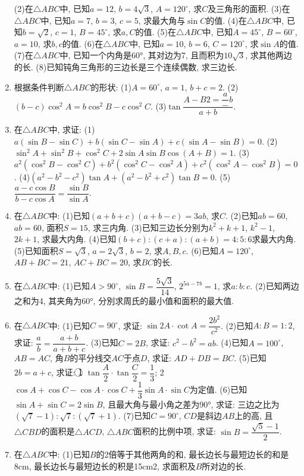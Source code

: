 \documentclass[10pt,a4paper]{article}
\begin{document}
\begin{enumerate}[1.]
(2)在$\triangle ABC$中, 已知$a=12$, $b=4\sqrt 3$, $A=120^\circ$, 求$C$及三角形的面积.
(3)在$\triangle ABC$中, 已知$a=7$, $b=3$, $c=5$, 求最大角与$\sin C$的值.
(4)在$\triangle ABC$中, 已知$b=\sqrt 2$, $c=1$, $B=45^\circ$, 求$a,C$的值.
(5)在$\triangle ABC$中, 已知$A=45^\circ$, $B=60^\circ$, $a=10$, 求$b,c$的值.
(6)在$\triangle ABC$中, 已知$a=10$, $b=6$, $C=120^\circ$, 求$\sin A$的值.
(7)在$\triangle ABC$中, 已知一个内角是60°, 其对边为7, 且而积为$10\sqrt 3$, 求其他两边的长.
(8)已知钝角三角形的三边长是三个连续偶数, 求三边长.
\item 根据条件判断$\triangle ABC$的形状:
(1)$A=60^{\circ}$, $a=1$, $b+c=2$.			(2)$(b-c)\cos ^2A=b\cos ^2B-c\cos ^2C$.
(3)$\tan \dfrac{A-B2=\dfrac a-b}{a+b}$.
\item 在$\triangle ABC$中, 求证:
(1)$a(\sin B-\sin C)+b(\sin C-\sin A)+c(\sin A-\sin B)=0$.
(2)$\sin ^2A+\sin ^2B+\cos ^2C+2\sin A\sin B\cos (A+B)=1$.
(3)$a^2(\cos ^2B-\cos ^2C)+b^2(\cos ^2C-\cos ^2A)+c^2(\cos ^2A-\cos ^2B)=0$.
(4)$(a^2-b^2-c^2)\tan A+(a^2-b^2+c^2)\tan B=0$.
(5)$\dfrac{a-c\cos B}{b-c\cos A}=\dfrac{\sin B}{\sin A}$.
\item 在$\triangle ABC$中:
(1)已知$(a+b+c)(a+b-c)=3ab$, 求$C$.
(2)已知$ab=60$, $ab=60$, 面积$S=15$, 求三内角.
(3)已知三边长分别为$k^2+k+1$, $k^2-1$, $2k+1$, 求最大内角.
(4)已知$(b+c):(c+a):(a+b)=4:5:6$求最大内角.
(5)已知面积$S=\sqrt 3$, $a=2\sqrt 3$, $b=2$, 求$A,B,c$.
(6)已知$A=120^\circ$, $AB+BC=21$, $AC+BC=20$, 求$BC$的长.
\item 在$\triangle ABC$中:
(1)已知$A>90^{\circ}$, $\sin B=\dfrac{5\sqrt 3}{14}$, $2^{5a-7b}=1$, 求$a:b:c$.
(2)已知两边之和为4, 其夹角为60°, 分別求周氏的最小值和面积的最大值.
\item 在$\triangle ABC$中:
(1)已知$C=90^{\circ}$, 求证: $\sin 2A\cdot \cot A=\dfrac{2b^2}{c^2}$.
(2)已知$A:B=1:2$, 求证: $\dfrac ab=\dfrac{a+b}{a+b+c}$.
(3)已知$C=2B$, 求证: $c^2-b^2=ab$.
(4)已知$A=100^\circ$, $AB=AC$, 角$B$的平分线交$AC$于点$D$, 求证: $AD+DB=BC$.
(5)已知$2b=a+c$, 求证:
\textcircled{1} $\tan \dfrac A2\cdot \tan \dfrac C2=\dfrac 13$;
\textcircled{2} $\cos A+\cos C-\cos A\cdot \cos C+\dfrac 13\sin A\cdot \sin C$为定值.
(6)已知$\sin A+\sin C=2\sin B$, 且最大角与最小角之差为90°, 求证: 三边之比为$(\sqrt 7-1):\sqrt 7:(\sqrt 7+1)$.
(7)已知$C=90^\circ$, $CD$是斜边$AB$上的高, 且$\triangle CBD$的面积是$\triangle ACD$, $\triangle ABC$面积的比例中项, 求证: $\sin B=\dfrac{\sqrt 5-1}2$.
\item 在$\triangle ABC$中:
(1)已知$B$的2倍等于其他两角的和, 最长边长与最短边长的和是8cm, 最长边长与最短边长的积是15cm2, 求面积及$B$所对边的长.

\end{enumerate}
\end{document}
